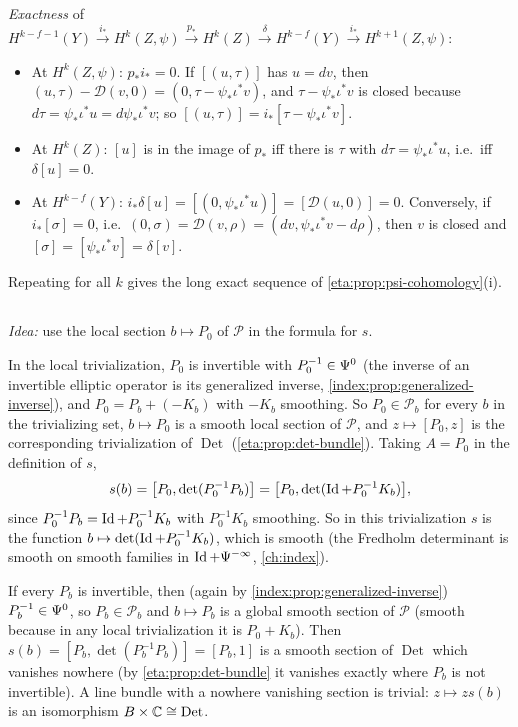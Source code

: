 \emph{Exactness} of $H^{k-f-1}(Y)\xrightarrow{i_*}H^k(Z,\psi)\xrightarrow{p_*}H^k(Z)
\xrightarrow{\delta}H^{k-f}(Y)\xrightarrow{i_*}H^{k+1}(Z,\psi)$:
\begin{itemize}
\item At $H^k(Z,\psi)$: $p_*i_*=0$. If $[(u,\tau)]$ has $u=dv$, then
  $(u,\tau)-\mathcal D(v,0)=(0,\tau-\psi_*\iota^*v)$, and $\tau-\psi_*\iota^*v$ is
  closed because $d\tau=\psi_*\iota^*u=d\psi_*\iota^*v$; so
  $[(u,\tau)]=i_*[\tau-\psi_*\iota^*v]$.
\item At $H^k(Z)$: $[u]$ is in the image of $p_*$ iff there is $\tau$ with
  $d\tau=\psi_*\iota^*u$, i.e.\ iff $\delta[u]=0$.
\item At $H^{k-f}(Y)$: $i_*\delta[u]=[(0,\psi_*\iota^*u)]=[\mathcal D(u,0)]=0$.
  Conversely, if $i_*[\sigma]=0$, i.e.\ $(0,\sigma)=\mathcal D(v,\rho)=
  (dv,\psi_*\iota^*v-d\rho)$, then $v$ is closed and $[\sigma]=[\psi_*\iota^*v]=
  \delta[v]$.
\end{itemize}
Repeating for all $k$ gives the long exact sequence of
\cref{eta:prop:psi-cohomology}(i).

\subsection*{}

\emph{Idea:} use the local section $b\mapsto P_0$ of $\mathcal P$ in the formula for
$s$.

In the local trivialization, $P_0$ is invertible with $P_0^{-1}\in\Psi^{0}$ (the
inverse of an invertible elliptic operator is its generalized inverse,
\cref{index:prop:generalized-inverse}), and $P_0=P_b+(-K_b)$ with $-K_b$ smoothing.
So $P_0\in\mathcal P_b$ for every $b$ in the trivializing set, $b\mapsto P_0$ is a
smooth local section of $\mathcal P$, and $z\mapsto[P_0,z]$ is the corresponding
trivialization of $\operatorname{Det}$ (\cref{eta:prop:det-bundle}). Taking $A=P_0$
in the definition of $s$,
\begin{equation*}
  s(b)=\bigl[P_0,\det(P_0^{-1}P_b)\bigr]=\bigl[P_0,\det(\operatorname{Id}+P_0^{-1}K_b)\bigr],
\end{equation*}
since $P_0^{-1}P_b=\operatorname{Id}+P_0^{-1}K_b$ with $P_0^{-1}K_b$ smoothing. So in this
trivialization $s$ is the function $b\mapsto\det(\operatorname{Id}+P_0^{-1}K_b)$, which is smooth
(the Fredholm determinant is smooth on smooth families in $\operatorname{Id}+\Psi^{-\infty}$,
\cref{ch:index}).

If every $P_b$ is invertible, then (again by
\cref{index:prop:generalized-inverse}) $P_b^{-1}\in\Psi^{0}$, so $P_b\in\mathcal P_b$
and $b\mapsto P_b$ is a global smooth section of $\mathcal P$ (smooth because in
any local trivialization it is $P_0+K_b$). Then
$s(b)=[P_b,\det(P_b^{-1}P_b)]=[P_b,1]$ is a smooth section of $\operatorname{Det}$
which vanishes nowhere (by \cref{eta:prop:det-bundle} it vanishes exactly where $P_b$
is not invertible). A line bundle with a nowhere vanishing section is trivial:
$z\mapsto zs(b)$ is an isomorphism $B\times\mathbb{C}\cong\operatorname{Det}$.
